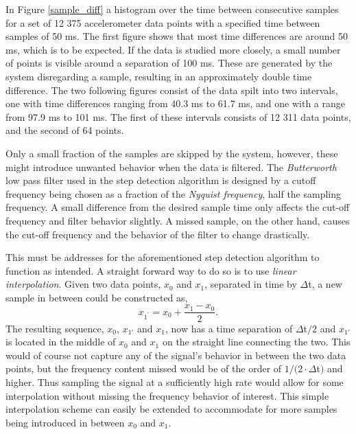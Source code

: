 \documentclass{LTHthesis}
\begin{document}
In Figure \ref{sample_diff} a histogram over the time between consecutive samples for a set of 12 375 accelerometer data points with a specified time between samples of 50 ms. The first figure shows that most time differences are around 50 ms, which is to be expected. If the data is studied more closely, a small number of points is visible around a separation of 100 ms. These are generated by the system disregarding a sample, resulting in an approximately double time difference. The two following figures consist of the data spilt into two intervals, one with time differences ranging from 
40.3 ms to 61.7 ms, and one with a range from 97.9 ms to 101 ms. The first of these intervals consists of 12 311 data points, and the second of 64 points. 

Only a small fraction of the samples are skipped by the system, however, these might introduce unwanted behavior when the data is filtered. The \emph{Butterworth} low pass filter used in the step detection algorithm is designed by a cutoff frequency being chosen as a fraction of the \emph{Nyquist frequency}, half the sampling frequency. A small difference from the desired sample time only affects the cut-off frequency and filter behavior slightly. A missed sample, on the other hand, causes the cut-off frequency and the behavior of the filter to change drastically. 

This must be addresses for the aforementioned step detection algorithm to function as intended. A straight forward way to do so is to use \emph{linear interpolation}.  Given two data points, $x_0$ and $x_1$, separated in time by $\Delta $t, a new sample in between could be constructed as,
%
\begin{equation}
x_{1^\prime}=x_0+\frac{x_1-x_0}{2}.
\end{equation}
%
The resulting sequence, $x_0$, $x_{1'}$ and $x_1$, now has a time separation of $\Delta $t$/2$ and $x_{1'}$ is located in the middle of $x_0$ and $x_1$ on the straight line connecting the two. This would of course not capture any of the signal's behavior in between the two data points, but the frequency content missed would be of the order of $1/(2\cdot\Delta$t$)$ and higher. Thus sampling the signal at a sufficiently high rate would allow for some interpolation without missing the frequency behavior of interest. This simple interpolation scheme can easily be extended to accommodate for more samples being introduced in between $x_0$ and $x_1$.
\end{document}
